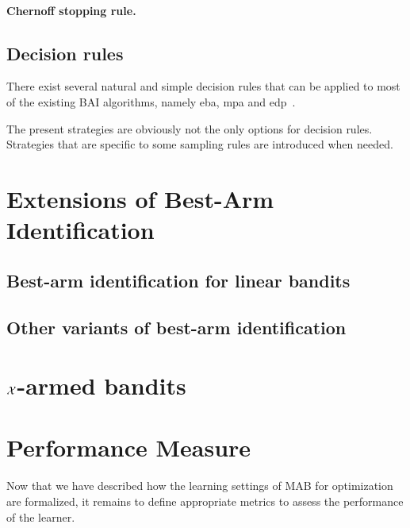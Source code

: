 \paragraph{Chernoff stopping rule.}

\subsection{Decision rules}\label{sec:mab.bai.decision}

There exist several natural and simple decision rules that can be applied to most of the existing BAI algorithms, namely \gls{eba}, \gls{mpa} and \gls{edp}~\citep{bubeck2009pure}.

\begin{remark}
\begin{leftbar}[remarkbar]
    The present strategies are obviously not the only options for decision rules. Strategies that are specific to some sampling rules are introduced when needed.
\end{leftbar}
\end{remark}

\section{Extensions of Best-Arm Identification}\label{sec:mab.extensions}

\subsection{Best-arm identification for linear bandits}\label{sec:mab.extensions.linear}

\subsection{Other variants of best-arm identification}\label{sec:mab.extensions.other}

\section{$\mathcal{X}$-armed bandits}\label{sec:mab.continuum}

\section{Performance Measure}\label{sec:mab.performance}

Now that we have described how the learning settings of MAB for optimization are formalized, it remains to define appropriate metrics to assess the performance of the learner.

